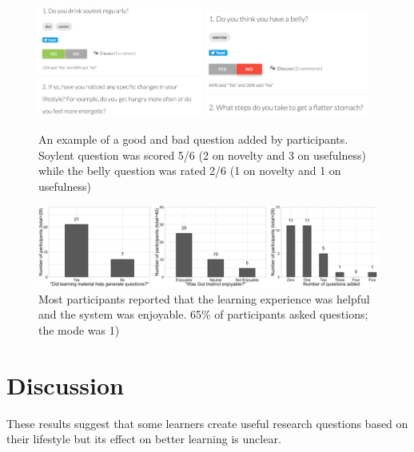 \begin{figure}[h] 
  \centering
  \includegraphics[width=0.48\textwidth]{figures/gutinstinct/gi-8a.png}
  \includegraphics[width=0.48\textwidth]{figures/gutinstinct/gi-8b.png}
  \caption[Examples of questions added by participants]
{An example of a good and bad question added by participants. Soylent question was scored 5/6 (2 on novelty and 3 on usefulness) while the belly question was rated 2/6 (1 on novelty and 1 on usefulness) }
  \label{fig:gi-8}
\end{figure}

\begin{figure}[h] 
  \centering
  \includegraphics[width=1.0\textwidth]{figures/gutinstinct/gi-9.png}
  \caption[Participants' self-reports]
{Most participants reported that the learning experience was helpful and the system was enjoyable. 65\% of participants asked questions; the mode was 1) }
  \label{fig:gi-9}
\end{figure}

\section{Discussion}
These results suggest that some learners create useful research questions based on their lifestyle but its effect on better learning is unclear.

